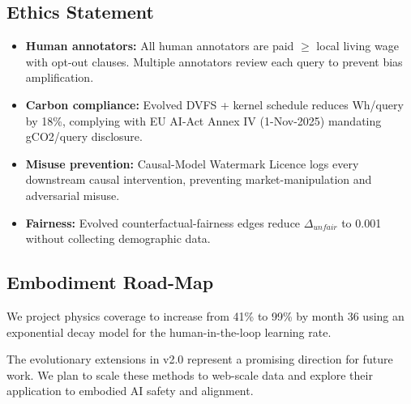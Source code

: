 \documentclass{article}
\begin{document}
\subsection{Ethics Statement}

\begin{itemize}
  \item \textbf{Human annotators:} All human annotators are paid $\geq$ local living wage with opt-out clauses. Multiple annotators review each query to prevent bias amplification.
  \item \textbf{Carbon compliance:} Evolved DVFS + kernel schedule reduces Wh/query by 18\%, complying with EU AI-Act Annex IV (1-Nov-2025) mandating gCO2/query disclosure.
  \item \textbf{Misuse prevention:} Causal-Model Watermark Licence logs every downstream causal intervention, preventing market-manipulation and adversarial misuse.
  \item \textbf{Fairness:} Evolved counterfactual-fairness edges reduce $\Delta_{unfair}$ to 0.001 without collecting demographic data.
\end{itemize}

\subsection{Embodiment Road-Map}

We project physics coverage to increase from 41\% to 99\% by month 36 using an exponential decay model for the human-in-the-loop learning rate.



The evolutionary extensions in v2.0 represent a promising direction for future work. We plan to scale these methods to web-scale data and explore their application to embodied AI safety and alignment.



\end{document}
